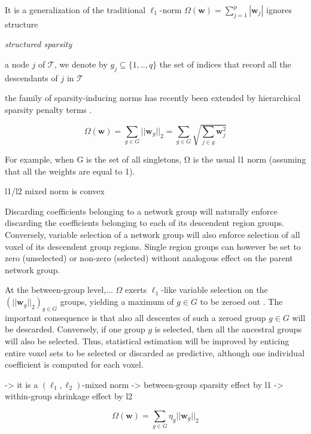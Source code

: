 \documentclass{article} %
\begin{document}
It is a generalization of the traditional $\ell_1$-norm
$\Omega(\mathbf{w}) = \sum_{j=1}^p|\mathbf{w}_j|$
ignores structure


\cite{jenatton2011multi}

\textit{structured sparsity}

\cite{huang2011learning, morales2010family, jenatton2011structured}


a node $j$ of $\mathcal{T}$,
we denote by $g_j \subseteq \{1,..,q\}$ the set of indices that record
all the descendants of $j$ in $\mathcal{T}$

the family of sparsity-inducing norms has recently been extended
by hierarchical sparsity penalty terms
\cite{zhao2009composite}.


\begin{equation}
  \Omega(\mathbf{w}) = \sum_{g \in G}||\mathbf{w}_g||_2 = \sum_{g \in G}\sqrt{\sum_{j \in g}\mathbf{w}_j^2}
\end{equation}

For example, when G is the set of all singletons, Ω is the
usual l1 norm (assuming that all the weights are equal to 1).

l1/l2 mixed norm is convex


Discarding coefficients belonging to a network group will naturally enforce
discarding the coefficients belonging to each of its descendent region groups.
Conversely,
variable selection of a network group will also enforce
selection of all voxel of its descendent group regions.
Single region groups can however be set to zero (unselected)
or non-zero (selected)
without analogous effect on the parent network group.




At the between-group level,...
$\Omega$ exerts $\ell_1$-like variable selection on
the $(||\mathbf{w}_g||_2)_{g\in G}$ groups,
yielding a maximum of $g \in G$ to be zeroed out
\cite{jenatton2011structured}.
The important consequence is that also all descentes of such a zeroed
group $g \in G$ will be descarded.
Conversely,
if one group $g$ is selected,
then all the ancestral groups will also be selected.
Thus, statistical estimation will be improved by enticing
entire voxel sets to be selected or discarded as predictive, 
although one individual coefficient is computed for each voxel.

-> it is a $(\ell_1, \ell_2)$-mixed norm
-> between-group sparsity effect by l1
-> within-group shrinkage effect by l2


\begin{equation}
  \Omega(\mathbf{w}) = \sum_{g \in G} \eta_g ||\mathbf{w}_g||_2
\end{equation}
\end{document}
